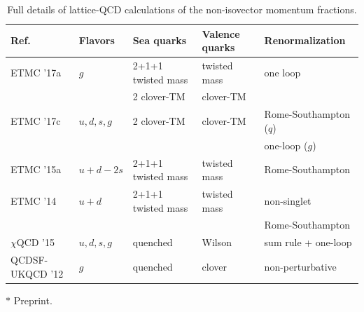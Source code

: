 \begin{table}[!t]
\renewcommand{\arraystretch}{1.2} 
\centering
\footnotesize
\begin{threeparttable}
\begin{tabular}{lllll}
\bottomrule
Ref. & Flavors & Sea quarks & Valence quarks & Renormalization \\
\midrule

  ETMC '17a \cite{Alexandrou:2016ekb} & $g$
    & 2+1+1 twisted mass & twisted mass & one loop \\
  & & 2 clover-TM & clover-TM & \\

  ETMC '17c \cite{Alexandrou:2017oeh} & $u,d,s,g$
    & 2 clover-TM & clover-TM & Rome-Southampton ($q$)\\
    & & & & one-loop ($g$)\\   
 
  ETMC '15a \cite{Alexandrou:2015qia} &
  $u+d-2s$ &  2+1+1 twisted mass & twisted mass & Rome-Southampton \\

  ETMC '14 \cite{Abdel-Rehim:2013wlz} &
  $u+d$ & 2+1+1 twisted mass & twisted mass & non-singlet\\ 
  & & & & Rome-Southampton\\

  $\chi$QCD '15 \cite{Deka:2013zha} &
  $u,d,s,g$ & quenched & Wilson & sum rule + one-loop \\

  QCDSF-UKQCD '12 \cite{Horsley:2012pz} &
  $g$ & quenched & clover & non-perturbative \\
\bottomrule
\end{tabular}
\begin{tablenotes}
\scriptsize
\item[$*$] Preprint.
\end{tablenotes}
\end{threeparttable}
\caption{\small Full details of lattice-QCD calculations of the non-isovector 
momentum fractions.}
\label{tab:nonisovectormomfrac}
\end{table}

